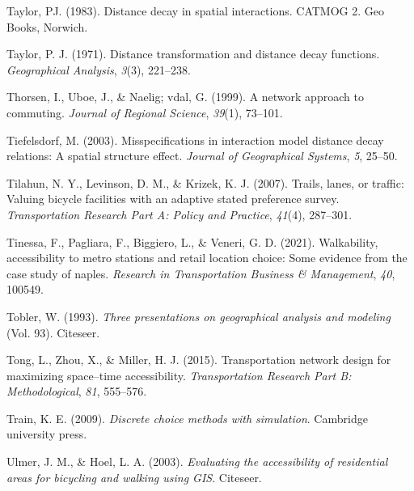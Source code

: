 \documentclass[
11pt, %
oneside, %
english, %
singlespacing, %
]{macthesis} %
\newlength{\cslhangindent}
\newenvironment{CSLReferences}[2] %
 {%
  \setlength{\parindent}{0pt}
  \ifodd #1 \everypar{\setlength{\hangindent}{\cslhangindent}}\ignorespaces\fi
  \ifnum #2 > 0
  \setlength{\parskip}{#2\baselineskip}
  \fi
 }%
 {}
\begin{document}
\begin{CSLReferences}{1}{0}
\leavevmode{}%
Taylor, PJ. (1983). Distance decay in spatial interactions. CATMOG 2. Geo Books, Norwich.

\leavevmode{}%
Taylor, P. J. (1971). Distance transformation and distance decay functions. \emph{Geographical Analysis}, \emph{3}(3), 221--238.

\leavevmode{}%
Thorsen, I., Uboe, J., \& Naelig; vdal, G. (1999). A network approach to commuting. \emph{Journal of Regional Science}, \emph{39}(1), 73--101.

\leavevmode{}%
Tiefelsdorf, M. (2003). Misspecifications in interaction model distance decay relations: A spatial structure effect. \emph{Journal of Geographical Systems}, \emph{5}, 25--50.

\leavevmode{}%
Tilahun, N. Y., Levinson, D. M., \& Krizek, K. J. (2007). Trails, lanes, or traffic: Valuing bicycle facilities with an adaptive stated preference survey. \emph{Transportation Research Part A: Policy and Practice}, \emph{41}(4), 287--301.

\leavevmode{}%
Tinessa, F., Pagliara, F., Biggiero, L., \& Veneri, G. D. (2021). Walkability, accessibility to metro stations and retail location choice: Some evidence from the case study of naples. \emph{Research in Transportation Business \& Management}, \emph{40}, 100549.

\leavevmode{}%
Tobler, W. (1993). \emph{Three presentations on geographical analysis and modeling} (Vol. 93). Citeseer.

\leavevmode{}%
Tong, L., Zhou, X., \& Miller, H. J. (2015). Transportation network design for maximizing space--time accessibility. \emph{Transportation Research Part B: Methodological}, \emph{81}, 555--576.

\leavevmode{}%
Train, K. E. (2009). \emph{Discrete choice methods with simulation}. Cambridge university press.

\leavevmode{}%
Ulmer, J. M., \& Hoel, L. A. (2003). \emph{Evaluating the accessibility of residential areas for bicycling and walking using GIS}. Citeseer.


\end{CSLReferences}
\end{document}
